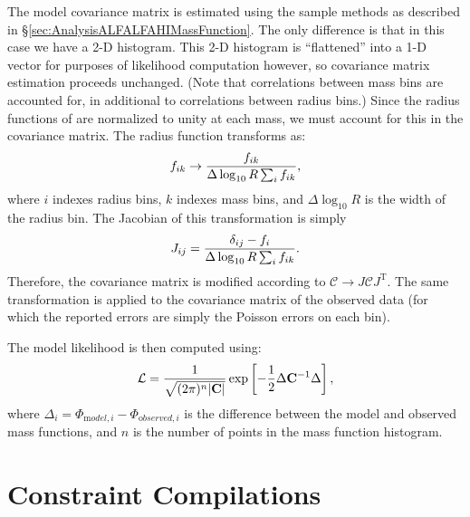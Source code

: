 The model covariance matrix is estimated using the sample methods as described in \S\ref{sec:AnalysisALFALFAHIMassFunction}. The only difference is that in this case we have a 2-D histogram. This 2-D histogram is ``flattened'' into a 1-D vector for purposes of likelihood computation however, so covariance matrix estimation proceeds unchanged. (Note that correlations between mass bins are accounted for, in additional to correlations between radius bins.) Since the radius functions of \cite{shen_size_2003} are normalized to unity at each mass, we must account for this in the covariance matrix. The radius function transforms as:
\begin{equation}
 f_{ik} \rightarrow {f_{ik} \over \Delta \log_{10} R \sum_i f_{ik} },
\end{equation}
where $i$ indexes radius bins, $k$ indexes mass bins, and $\Delta \log_{10} R$ is the width of the radius bin. The Jacobian of this transformation is simply
\begin{equation}
 J_{ij} = {\delta_{ij} - f_i \over  \Delta \log_{10} R \sum_i f_{ik}}.
\end{equation}
Therefore, the covariance matrix is modified according to $\mathcal{C} \rightarrow J \mathcal{C} J^{\mathrm T}$. The same transformation is applied to the covariance matrix of the observed data (for which the reported errors are simply the Poisson errors on each bin).

The model likelihood is then computed using:
\begin{equation}
 \mathcal{L} = {1 \over \sqrt{(2 \pi)^n |{\mathbf C}|}} \exp\left[ -{1\over 2} \Delta {\mathbf C}^{-1} \Delta \right],
\end{equation}
where $\Delta_i = \Phi_{{\mathrm model}, i} - \Phi_{{\mathrm observed}, i}$ is the difference between the model and observed mass functions, and $n$ is the number of points in the mass function histogram.

\section{Constraint Compilations}

